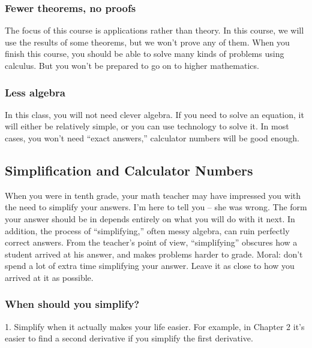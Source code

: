 \subsubsection{Fewer theorems, no
proofs}\label{fewer-theorems-no-proofs}

The focus of this course is applications rather than theory. In this
course, we will use the results of some theorems, but we won't prove any
of them. When you finish this course, you should be able to solve many
kinds of problems using calculus. But you won't be prepared to go on to
higher mathematics.

\subsubsection{ Less algebra}\label{less-algebra}

In this class, you will not need clever algebra. If you need to solve an
equation, it will either be relatively simple, or you can use technology
to solve it. In most cases, you won't need ``exact answers,'' calculator
numbers will be good enough.

\hypertarget{simplification-and-calculator-numbers}{\subsection{\texorpdfstring{\textbf{Simplification
and Calculator
Numbers}}{Simplification and Calculator Numbers}}\label{simplification-and-calculator-numbers}}

When you were in tenth grade, your math teacher may have impressed you
with the need to simplify your answers. I'm here to tell you -- she was
wrong. The form your answer should be in depends entirely on what you
will do with it next. In addition, the process of ``simplifying,'' often
messy algebra, can ruin perfectly correct answers. From the teacher's
point of view, ``simplifying'' obscures how a student arrived at his
answer, and makes problems harder to grade. Moral: don't spend a lot of
extra time simplifying your answer. Leave it as close to how you arrived
at it as possible.

\subsubsection{When should you simplify?
}\label{when-should-you-simplify}

1. Simplify when it actually makes your life easier. For example, in
Chapter 2 it's easier to find a second derivative if you simplify the
first derivative.

